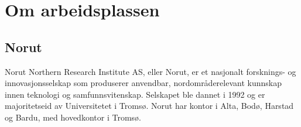 \documentclass[12pt, a4paper]{article}
\begin{document}








\newpage
\section{Om arbeidsplassen}
\subsection{Norut}
Norut Northern Research Institute AS, eller Norut, er et nasjonalt forsknings- og innovasjonsselskap som produserer anvendbar, nordområderelevant kunnskap innen teknologi og samfunnsvitenskap. Selskapet ble dannet i 1992 og er majoritetseid av Universitetet i Tromsø. Norut har kontor i Alta, Bodø, Harstad og Bardu, med hovedkontor i Tromsø. \\
\end{document}
